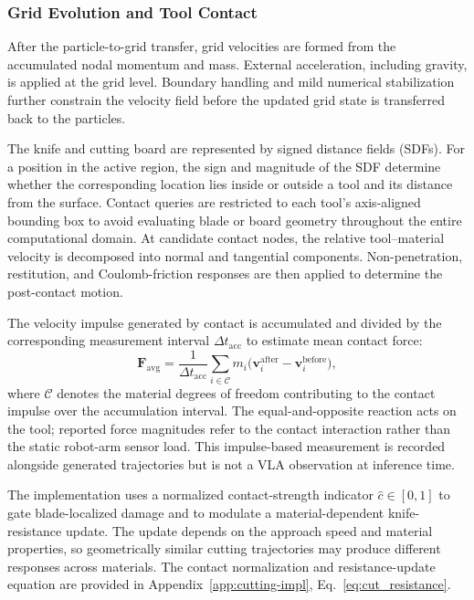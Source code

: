 \subsubsection{Grid Evolution and Tool Contact}
After the particle-to-grid transfer, grid velocities are formed from the accumulated nodal momentum and mass. External acceleration, including gravity, is applied at the grid level. Boundary handling and mild numerical stabilization further constrain the velocity field before the updated grid state is transferred back to the particles.

The knife and cutting board are represented by signed distance fields (SDFs). For a position in the active region, the sign and magnitude of the SDF determine whether the corresponding location lies inside or outside a tool and its distance from the surface. Contact queries are restricted to each tool's axis-aligned bounding box to avoid evaluating blade or board geometry throughout the entire computational domain. At candidate contact nodes, the relative tool--material velocity is decomposed into normal and tangential components. Non-penetration, restitution, and Coulomb-friction responses are then applied to determine the post-contact motion.

The velocity impulse generated by contact is accumulated and divided by the corresponding measurement interval $\Delta t_{\mathrm{acc}}$ to estimate mean contact force:
\begin{equation}\label{eq:force}
  \mathbf{F}_{\mathrm{avg}}=
  \frac{1}{\Delta t_{\mathrm{acc}}}
  \sum_{i\in\mathcal{C}}m_i
  \bigl(\mathbf{v}_i^{\mathrm{after}}-\mathbf{v}_i^{\mathrm{before}}\bigr),
\end{equation}
where $\mathcal{C}$ denotes the material degrees of freedom contributing to the contact impulse over the accumulation interval. The equal-and-opposite reaction acts on the tool; reported force magnitudes refer to the contact interaction rather than the static robot-arm sensor load. This impulse-based measurement is recorded alongside generated trajectories but is not a VLA observation at inference time.

The implementation uses a normalized contact-strength indicator $\hat c\in[0,1]$ to gate blade-localized damage and to modulate a material-dependent knife-resistance update. The update depends on the approach speed and material properties, so geometrically similar cutting trajectories may produce different responses across materials. The contact normalization and resistance-update equation are provided in Appendix~\ref{app:cutting-impl}, Eq.~\eqref{eq:cut_resistance}.

